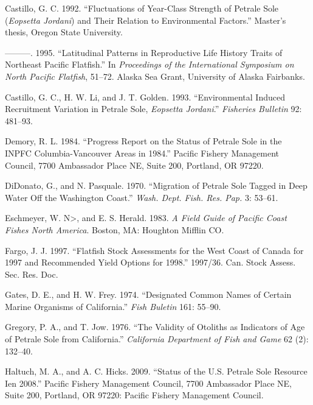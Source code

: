 \documentclass[11pt,
  english,
  letterpaper,
]{article}
\newlength{\cslhangindent}
\newenvironment{cslreferences}%
  {\setlength{\parindent}{0pt}%
  \everypar{\setlength{\hangindent}{\cslhangindent}}\ignorespaces}%
  {\par}
\begin{document}
\begin{cslreferences}
\leavevmode\hypertarget{ref-castillo_g.c._fluctuations_1992}{}%
Castillo, G. C. 1992. ``Fluctuations of Year-Class Strength of Petrale Sole (\emph{Eopsetta Jordani}) and Their Relation to Environmental Factors.'' Master's thesis, Oregon State University.

\leavevmode\hypertarget{ref-castillo_latitudinal_1995}{}%
---------. 1995. ``Latitudinal Patterns in Reproductive Life History Traits of Northeast Pacific Flatfish.'' In \emph{Proceedings of the International Symposium on North Pacific Flatfish}, 51--72. Alaska Sea Grant, University of Alaska Fairbanks.

\leavevmode\hypertarget{ref-castillo_g.c._environmental_1993}{}%
Castillo, G. C., H. W. Li, and J. T. Golden. 1993. ``Environmental Induced Recruitment Variation in Petrale Sole, \emph{Eopsetta Jordani}.'' \emph{Fisheries Bulletin} 92: 481--93.

\leavevmode\hypertarget{ref-demory_progress_1984}{}%
Demory, R. L. 1984. ``Progress Report on the Status of Petrale Sole in the INPFC Columbia-Vancouver Areas in 1984.'' Pacific Fishery Management Council, 7700 Ambassador Place NE, Suite 200, Portland, OR 97220.

\leavevmode\hypertarget{ref-didonato_migration_1970}{}%
DiDonato, G., and N. Pasquale. 1970. ``Migration of Petrale Sole Tagged in Deep Water Off the Washington Coast.'' \emph{Wash. Dept. Fish. Res. Pap.} 3: 53--61.

\leavevmode\hypertarget{ref-eschmeyer_field_1983}{}%
Eschmeyer, W. N\textgreater, and E. S. Herald. 1983. \emph{A Field Guide of Pacific Coast Fishes North America}. Boston, MA: Houghton Mifflin CO.

\leavevmode\hypertarget{ref-fargo_j.j._flatfish_1997}{}%
Fargo, J. J. 1997. ``Flatfish Stock Assessments for the West Coast of Canada for 1997 and Recommended Yield Options for 1998.'' 1997/36. Can. Stock Assess. Sec. Res. Doc.

\leavevmode\hypertarget{ref-gates_designated_1974}{}%
Gates, D. E., and H. W. Frey. 1974. ``Designated Common Names of Certain Marine Organisms of California.'' \emph{Fish Buletin} 161: 55--90.

\leavevmode\hypertarget{ref-gregory_validity_1976}{}%
Gregory, P. A., and T. Jow. 1976. ``The Validity of Otoliths as Indicators of Age of Petrale Sole from California.'' \emph{California Department of Fish and Game} 62 (2): 132--40.

\leavevmode\hypertarget{ref-haltuch_status_2009}{}%
Haltuch, M. A., and A. C. Hicks. 2009. ``Status of the U.S. Petrale Sole Resource Ien 2008.'' Pacific Fishery Management Council, 7700 Ambassador Place NE, Suite 200, Portland, OR 97220: Pacific Fishery Management Council.


\end{cslreferences}
\end{document}
